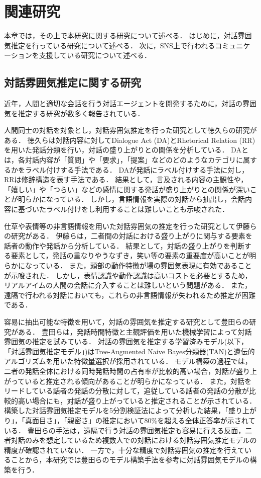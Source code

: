 \chapter{関連研究\label{sec:related_researchs}}
\thispagestyle{plain}

本章では，その上で本研究に関する研究について述べる．
はじめに，対話雰囲気推定を行っている研究について述べる．
次に，SNS上で行われるコミュニケーションを支援している研究について述べる．

\section{対話雰囲気推定に関する研究}
近年，人間と適切な会話を行う対話エージェントを開発するために，対話の雰囲気を推定する研究が数多く報告されている．

人間同士の対話を対象とし，対話雰囲気推定を行った研究として徳久ら\cite{Tokuhisa}の研究がある．
徳久らは対話内容に対してDialogue Act (DA)とRhetorical Relation (RR)を用いた発話分類を行い，対話の盛り上がりとの関係を分析している．
DAとは，各対話内容が「質問」や「要求」，「提案」などのどのようなカテゴリに属するかをラベル付けする手法である．
DAが発話にラベル付けする手法に対し，RRは修辞構造を表す手法である．
結果として，言及される内容の主観性や，「嬉しい」や「つらい」などの感情に関する発話が盛り上がりとの関係が深いことが明らかになっている．
しかし，言語情報を実際の対話から抽出し，会話内容に基づいたラベル付けをし利用することは難しいことも示唆された．

仕草や表情等の非言語情報を用いた対話雰囲気の推定を行った研究として伊藤ら\cite{Ito}の研究がある．
伊藤らは，二者間の対話における盛り上がりに関与する要素を話者の動作や発話から分析している．
結果として，対話の盛り上がりを判断する要素として，発話の重なりやうなずき，笑い等の要素の重要度が高いことが明らかになっている．
また，頭部の動作特徴が場の雰囲気表現に有効であることが示唆された．
しかし，表情認識や動作認識は高いコストを必要とするため，リアルアイムの人間の会話に介入することは難しいという問題がある．
また，遠隔で行われる対話においても，これらの非言語情報が失われるため推定が困難である．

容易に抽出可能な特徴を用いて，対話の雰囲気を推定する研究として豊田ら\cite{Toyota}の研究がある．
豊田らは，発話時間特徴と主観評価を用いた機械学習によって対話雰囲気の推定を試みている．
対話の雰囲気を推定する学習済みモデル(以下，「対話雰囲気推定モデル」)はTree-Augmented Naive Bayes分類器(TAN)と遺伝的アルゴリズムを用いた特徴量選択が採用されている．
モデル構築の過程では，二者の発話全体における同時発話時間の占有率が比較的高い場合，対話が盛り上がっていると推定される傾向があることが明らかになっている．
また，対話をリードしている話者の発話の分散に対して，追従している話者の発話の分散が比較的高い場合にも，対話が盛り上がっていると推定されることが示されている．
構築した対話雰囲気推定モデルを5分割検証法によって分析した結果，「盛り上がり」，「真面目さ」，「親密さ」の推定において80\%を超える全体正答率が示されている．
豊田らの手法は，遠隔で行う対話の雰囲気推定も容易に行える反面，二者対話のみを想定しているため複数人での対話における対話雰囲気推定モデルの精度が確認されていない．
一方で，十分な精度で対話雰囲気の推定を行えていることから，本研究では豊田らのモデル構築手法を参考に対話雰囲気モデルの構築を行う．

